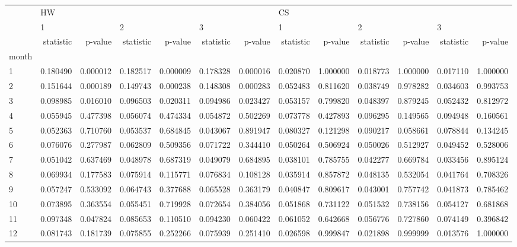 \begin{tabular}{lrrrrrrrrrrrr}
\toprule
{} & \multicolumn{6}{l}{HW} & \multicolumn{6}{l}{CS} \\
{} & \multicolumn{2}{l}{1} & \multicolumn{2}{l}{2} & \multicolumn{2}{l}{3} & \multicolumn{2}{l}{1} & \multicolumn{2}{l}{2} & \multicolumn{2}{l}{3} \\
{} & statistic &   p-value & statistic &   p-value & statistic &   p-value & statistic &   p-value & statistic &   p-value & statistic &   p-value \\
month &           &           &           &           &           &           &           &           &           &           &           &           \\
\midrule
1     &  0.180490 &  0.000012 &  0.182517 &  0.000009 &  0.178328 &  0.000016 &  0.020870 &  1.000000 &  0.018773 &  1.000000 &  0.017110 &  1.000000 \\
2     &  0.151644 &  0.000189 &  0.149743 &  0.000238 &  0.148308 &  0.000283 &  0.052483 &  0.811620 &  0.038749 &  0.978282 &  0.034603 &  0.993753 \\
3     &  0.098985 &  0.016010 &  0.096503 &  0.020311 &  0.094986 &  0.023427 &  0.053157 &  0.799820 &  0.048397 &  0.879245 &  0.052432 &  0.812972 \\
4     &  0.055945 &  0.477398 &  0.056074 &  0.474334 &  0.054872 &  0.502269 &  0.073778 &  0.427893 &  0.096295 &  0.149565 &  0.094948 &  0.160561 \\
5     &  0.052363 &  0.710760 &  0.053537 &  0.684845 &  0.043067 &  0.891947 &  0.080327 &  0.121298 &  0.090217 &  0.058661 &  0.078844 &  0.134245 \\
6     &  0.076076 &  0.277987 &  0.062809 &  0.509356 &  0.071722 &  0.344410 &  0.050264 &  0.506924 &  0.050026 &  0.512927 &  0.049452 &  0.528006 \\
7     &  0.051042 &  0.637469 &  0.048978 &  0.687319 &  0.049079 &  0.684895 &  0.038101 &  0.785755 &  0.042277 &  0.669784 &  0.033456 &  0.895124 \\
8     &  0.069934 &  0.177583 &  0.075914 &  0.115771 &  0.076834 &  0.108128 &  0.035914 &  0.857872 &  0.048135 &  0.532054 &  0.041764 &  0.708326 \\
9     &  0.057247 &  0.533092 &  0.064743 &  0.377688 &  0.065528 &  0.363179 &  0.040847 &  0.809617 &  0.043001 &  0.757742 &  0.041873 &  0.785462 \\
10    &  0.073895 &  0.363554 &  0.055451 &  0.719928 &  0.072654 &  0.384056 &  0.051868 &  0.731122 &  0.051532 &  0.738156 &  0.054127 &  0.681868 \\
11    &  0.097348 &  0.047824 &  0.085653 &  0.110510 &  0.094230 &  0.060422 &  0.061052 &  0.642668 &  0.056776 &  0.727860 &  0.074149 &  0.396842 \\
12    &  0.081743 &  0.181739 &  0.075855 &  0.252266 &  0.075939 &  0.251410 &  0.026598 &  0.999847 &  0.021898 &  0.999999 &  0.013576 &  1.000000 \\
\bottomrule
\end{tabular}
